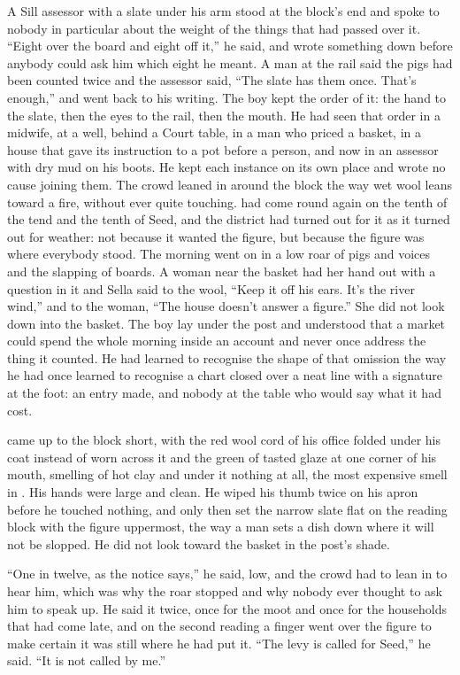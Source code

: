 A Sill assessor with a slate under his arm stood at the block's end and spoke to nobody in particular about the weight of the things that had passed over it. “Eight over the board and eight off it,” he said, and wrote something down before anybody could ask him which eight he meant. A man at the rail said the pigs had been counted twice and the assessor said, “The slate has them once. That's enough,” and went back to his writing. The boy kept the order of it: the hand to the slate, then the eyes to the rail, then the mouth. He had seen that order in a midwife, at a well, behind a Court table, in a man who priced a basket, in a house that gave its instruction to a pot before a person, and now in an assessor with dry mud on his boots. He kept each instance on its own place and wrote no cause joining them. The crowd leaned in around the block the way wet wool leans toward a fire, without ever quite touching.  had come round again on the tenth of the tend and the tenth of Seed, and the district had turned out for it as it turned out for weather: not because it wanted the figure, but because the figure was where everybody stood. The morning went on in a low roar of pigs and voices and the slapping of boards. A woman near the basket had her hand out with a question in it and Sella said to the wool, “Keep it off his ears. It's the river wind,” and to the woman, “The house doesn't answer a figure.” She did not look down into the basket. The boy lay under the post and understood that a market could spend the whole morning inside an account and never once address the thing it counted. He had learned to recognise the shape of that omission the way he had once learned to recognise a chart closed over a neat line with a signature at the foot: an entry made, and nobody at the table who would say what it had cost.

 came up to the block short, with the red wool cord of his office folded under his coat instead of worn across it and the green of tasted glaze at one corner of his mouth, smelling of hot clay and under it nothing at all, the most expensive smell in . His hands were large and clean. He wiped his thumb twice on his apron before he touched nothing, and only then set the narrow slate flat on the reading block with the figure uppermost, the way a man sets a dish down where it will not be slopped. He did not look toward the basket in the post's shade.

“One in twelve, as the notice says,” he said, low, and the crowd had to lean in to hear him, which was why the roar stopped and why nobody ever thought to ask him to speak up. He said it twice, once for the moot and once for the households that had come late, and on the second reading a finger went over the figure to make certain it was still where he had put it. “The levy is called for Seed,” he said. “It is not called by me.”

